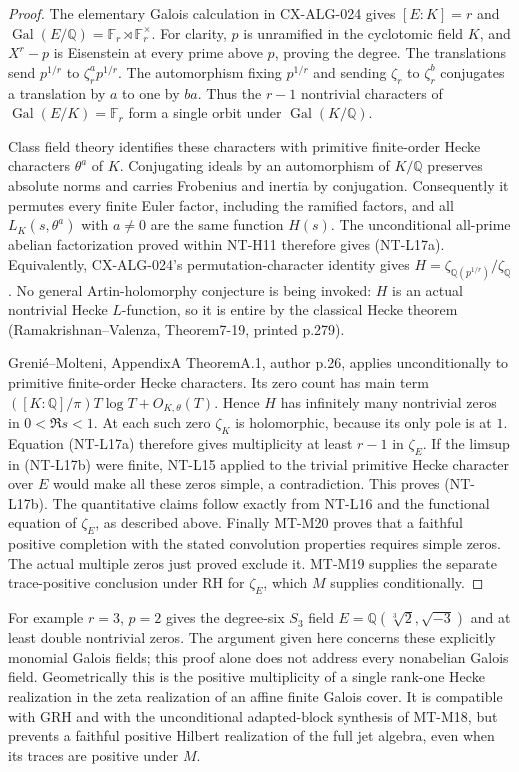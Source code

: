 \begin{proof}
The elementary Galois calculation in CX-ALG-024 gives
$[E:K]=r$ and
$\operatorname{Gal}(E/\mathbb Q)=\mathbb F_r\rtimes\mathbb F_r^\times$.
For clarity, $p$ is unramified in the cyclotomic field $K$, and
$X^r-p$ is Eisenstein at every prime above $p$, proving the degree.
The translations send $p^{1/r}$ to $\zeta_r^a p^{1/r}$.
The automorphism fixing $p^{1/r}$ and sending $\zeta_r$ to
$\zeta_r^b$ conjugates a translation by $a$ to one by $ba$.
Thus the $r-1$ nontrivial characters of
$\operatorname{Gal}(E/K)=\mathbb F_r$ form a single orbit under
$\operatorname{Gal}(K/\mathbb Q)$.

Class field theory identifies these characters with primitive
finite-order Hecke characters $\theta^a$ of $K$.
Conjugating ideals by an automorphism of $K/\mathbb Q$ preserves
absolute norms and carries Frobenius and inertia by conjugation.
Consequently it permutes every finite Euler factor, including the
ramified factors, and all $L_K(s,\theta^a)$ with $a\ne0$ are the
same function $H(s)$. The unconditional all-prime abelian factorization
proved within NT-H11 therefore gives (NT-L17a).
Equivalently, CX-ALG-024's permutation-character identity gives
$H=\zeta_{\mathbb Q(p^{1/r})}/\zeta_{\mathbb Q}$.
No general Artin-holomorphy conjecture is being invoked: $H$ is an
actual nontrivial Hecke $L$-function, so it is entire by the classical
Hecke theorem (Ramakrishnan--Valenza, Theorem7-19, printed p.279).

Greni\'e--Molteni, AppendixA TheoremA.1, author p.26, applies
unconditionally to primitive finite-order Hecke characters. Its
zero count has main term
$([K:\mathbb Q]/\pi)T\log T+O_{K,\theta}(T)$.
Hence $H$ has infinitely many nontrivial zeros in $0<\Re s<1$.
At each such zero $\zeta_K$ is holomorphic, because its only pole
is at $1$. Equation (NT-L17a) therefore gives multiplicity at
least $r-1$ in $\zeta_E$.
If the limsup in (NT-L17b) were finite, NT-L15 applied to the
trivial primitive Hecke character over $E$ would make all these
zeros simple, a contradiction. This proves (NT-L17b).
The quantitative claims follow exactly from NT-L16 and the
functional equation of $\zeta_E$, as described above.
Finally MT-M20 proves that a faithful positive completion with the
stated convolution properties requires simple zeros. The actual
multiple zeros just proved exclude it. MT-M19 supplies the separate
trace-positive conclusion under RH for $\zeta_E$, which $M$ supplies
conditionally.
\end{proof}
For example $r=3$, $p=2$ gives the degree-six $S_3$ field
$E=\mathbb Q(\sqrt[3]{2},\sqrt{-3})$ and at least double nontrivial
zeros. The argument given here concerns these explicitly monomial
Galois fields; this proof alone does not address every nonabelian
Galois field.
Geometrically this is the positive multiplicity of a single
rank-one Hecke realization in the zeta realization of an affine
finite Galois cover. It is compatible with GRH and with the
unconditional adapted-block synthesis of MT-M18, but prevents
a faithful positive Hilbert realization of the full jet algebra,
even when its traces are positive under $M$.
